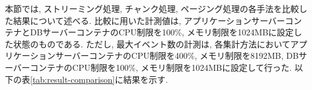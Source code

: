 \documentclass[../../main]{subfiles}
\begin{document}
    本節では, ストリーミング処理, チャンク処理, ページング処理の各手法を比較した結果について述べる. 比較に用いた計測値は, アプリケーションサーバーコンテナとDBサーバーコンテナのCPU制限を100\%, メモリ制限を1024MBに設定した状態のものである. ただし, 最大イベント数の計測は, 各集計方法においてアプリケーションサーバーコンテナのCPU制限を400\%, メモリ制限を8192MB, DBサーバーコンテナのCPU制限を100\%, メモリ制限を1024MBに設定して行った. 以下の表\ref{tab:result-comparison}に結果を示す.

    

    \clearpage
\end{document}
